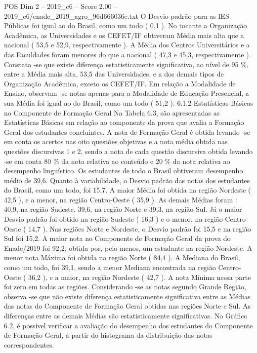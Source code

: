 \begin{textsample}{POS Dim 2 – 2019\_c6 – Score 2.00 – 2019\_c6/enade\_2019\_agro\_96d666036e.txt}
O Desvio padrão para as IES Públicas foi igual ao do Brasil, como um todo ( 0,1 ).
No tocante a Organização Acadêmica, as Universidades e os CEFET/IF obtiveram Média mais alta que a nacional ( 53,5 e 52,9, respectivamente ).
A Média dos Centros Universitários e a das Faculdades foram menores do que a nacional ( 47,3 e 45,3, respectivamente ).
Constata -se que existe diferença estatisticamente significativa, ao nível de 95 \%, entre a Média mais alta, 53,5 das Universidades, e a dos demais tipos de Organização Acadêmica, exceto os CEFET/IF.
Em relação a Modalidade de Ensino, observam -se notas apenas para a Modalidade de Educação Presencial, a sua Média foi igual ao do Brasil, como um todo ( 51,2 ). 6.1.2 Estatísticas Básicas no Componente de Formação Geral Na Tabela 6.3, são apresentadas as Estatísticas Básicas em relação ao componente da prova que avalia a Formação Geral dos estudantes concluintes.
A nota de Formação Geral é obtida levando -se em conta os acertos nas oito questões objetivas e a nota média obtida nas questões discursivas 1 e 2, sendo a nota de cada questão discursiva obtida levando -se em conta 80 \% da nota relativa ao conteúdo e 20 \% da nota relativa ao desempenho linguístico.
Os estudantes de todo o Brasil obtiveram desempenho médio de 39,6.
Quanto à variabilidade, o Desvio padrão das notas dos estudantes do Brasil, como um todo, foi 15,7.
A maior Média foi obtida na região Nordeste ( 42,5 ), e a menor, na região Centro-Oeste ( 35,9 ).
As demais Médias foram : 40,9, na região Sudeste, 39,6, na região Norte e 39,3, na região Sul.
Já o maior Desvio padrão foi obtido na região Sudeste ( 16,3 ) e o menor, na região Centro-Oeste ( 14,7 ).
Nas regiões Norte e Nordeste, o Desvio padrão foi 15,5 e na região Sul foi 15,2.
A maior nota no Componente de Formação Geral da prova do Enade/2019 foi 92,2, obtida por, pelo menos, um estudante na região Nordeste.
A menor nota Máxima foi obtida na região Norte ( 84,4 ).
A Mediana do Brasil, como um todo, foi 39,1, sendo a menor Mediana encontrada na região Centro-Oeste ( 36,2 ), e a maior, na região Nordeste ( 42,7 ).
A nota Mínima nessa parte foi zero em todas as regiões.
Considerando -se as notas segundo Grande Região, observa -se que não existe diferença estatisticamente significativa entre as Médias das notas do Componente de Formação Geral obtidas nas regiões Norte e Sul.
As diferenças entre as demais Médias são estatisticamente significativas.
No Gráfico 6.2, é possível verificar a avaliação do desempenho dos estudantes do Componente de Formação Geral, a partir do histograma da distribuição das notas correspondentes.

\end{textsample}
